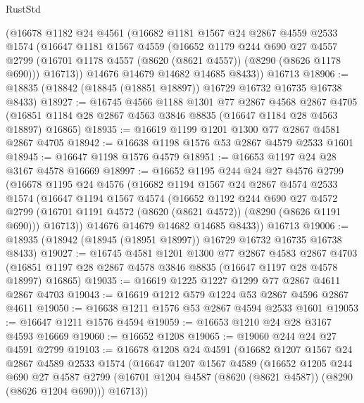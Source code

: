 \begin{lexlean}{RustStd}
\begin{coremodule}
    (@16678
      @1182
      @24
      @4561
      (@16682
        @1181
        @1567
        @24
        @2867
        @4559
        @2533
        @1574
        (@16647
          @1181
          @1567
          @4559
          (@16652
            @1179
            @244
            @690
            @27
            @4557
            @2799
            (@16701 @1178 @4557 (@8620 (@8621 @4557)) (@8290 (@8626 @1178 @690)))
            @16713))
        @14676
        @14679
        @14682
        @14685
        @8433))
    @16713
@18906 := @18835 (@18842 (@18845 (@18851 @18897)) @16729 @16732 @16735 @16738 @8433)
@18927 := @16745
    @4566
    @1188
    @1301
    @77
    @2867
    @4568
    @2867
    @4705
    (@16851 @1184 @28 @2867 @4563 @3846 @8835 (@16647 @1184 @28 @4563 @18897) @16865)
@18935 := @16619 @1199 @1201 @1300 @77 @2867 @4581 @2867 @4705
@18942 := @16638 @1198 @1576 @53 @2867 @4579 @2533 @1601
@18945 := @16647 @1198 @1576 @4579
@18951 := @16653 @1197 @24 @28 @3167 @4578 @16669
@18997 := @16652
    @1195
    @244
    @24
    @27
    @4576
    @2799
    (@16678
      @1195
      @24
      @4576
      (@16682
        @1194
        @1567
        @24
        @2867
        @4574
        @2533
        @1574
        (@16647
          @1194
          @1567
          @4574
          (@16652
            @1192
            @244
            @690
            @27
            @4572
            @2799
            (@16701 @1191 @4572 (@8620 (@8621 @4572)) (@8290 (@8626 @1191 @690)))
            @16713))
        @14676
        @14679
        @14682
        @14685
        @8433))
    @16713
@19006 := @18935 (@18942 (@18945 (@18951 @18997)) @16729 @16732 @16735 @16738 @8433)
@19027 := @16745
    @4581
    @1201
    @1300
    @77
    @2867
    @4583
    @2867
    @4703
    (@16851 @1197 @28 @2867 @4578 @3846 @8835 (@16647 @1197 @28 @4578 @18997) @16865)
@19035 := @16619 @1225 @1227 @1299 @77 @2867 @4611 @2867 @4703
@19043 := @16619 @1212 @579 @1224 @53 @2867 @4596 @2867 @4611
@19050 := @16638 @1211 @1576 @53 @2867 @4594 @2533 @1601
@19053 := @16647 @1211 @1576 @4594
@19059 := @16653 @1210 @24 @28 @3167 @4593 @16669
@19060 := @16652 @1208
@19065 := @19060 @244 @24 @27 @4591 @2799
@19103 := @16678
    @1208
    @24
    @4591
    (@16682
      @1207
      @1567
      @24
      @2867
      @4589
      @2533
      @1574
      (@16647
        @1207
        @1567
        @4589
        (@16652
          @1205
          @244
          @690
          @27
          @4587
          @2799
          (@16701 @1204 @4587 (@8620 (@8621 @4587)) (@8290 (@8626 @1204 @690)))
          @16713))

\end{coremodule}
\end{lexlean}
